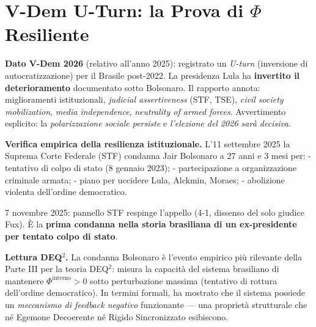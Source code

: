 \section{\texorpdfstring{V-Dem U-Turn: la Prova di \(\Phi\)
Resiliente}{V-Dem U-Turn: la Prova di \textbackslash Phi Resiliente}}\label{v-dem-u-turn-la-prova-di-phi-resiliente}

\Proved{} \textbf{Dato V-Dem 2026} (relativo all'anno 2025): registrato
un \emph{U-turn} (inversione di autocratizzazione) per il Brasile
post-2022. La presidenza Lula ha \textbf{invertito il deterioramento}
documentato sotto Bolsonaro. Il rapporto annota: miglioramenti
istituzionali, \emph{judicial assertiveness} (STF, TSE), \emph{civil
society mobilization}, \emph{media independence}, \emph{neutrality of
armed forces}. Avvertimento esplicito: la \emph{polarizzazione sociale
persiste} e \emph{l'elezione del 2026 sarà decisiva}.

\Proved{} \textbf{Verifica empirica della resilienza istituzionale.}
L'11 settembre 2025 la Suprema Corte Federale (STF) condanna Jair
Bolsonaro a 27 anni e 3 mesi per: - tentativo di colpo di stato (8
gennaio 2023); - partecipazione a organizzazione criminale armata; -
piano per uccidere Lula, Alckmin, Moraes; - abolizione violenta
dell'ordine democratico.

7 novembre 2025: pannello STF respinge l'appello (4-1, dissenso del solo
giudice Fux). È la \textbf{prima condanna nella storia brasiliana di un
ex-presidente per tentato colpo di stato}.

\Hypoth{} \textbf{Lettura DEQ$^2$. } La condanna Bolsonaro è l'evento
empirico più rilevante della Parte III per la teoria DEQ$^2$: misura la
capacità del sistema brasiliano di mantenere
\(\Phi^{\text{interno}} > 0\) sotto perturbazione massima (tentativo di
rottura dell'ordine democratico). In termini formali, ha mostrato che il
sistema possiede un \emph{meccanismo di feedback negativo} funzionante
--- una proprietà strutturale che né Egemone Decoerente né Rigido
Sincronizzato esibiscono.

